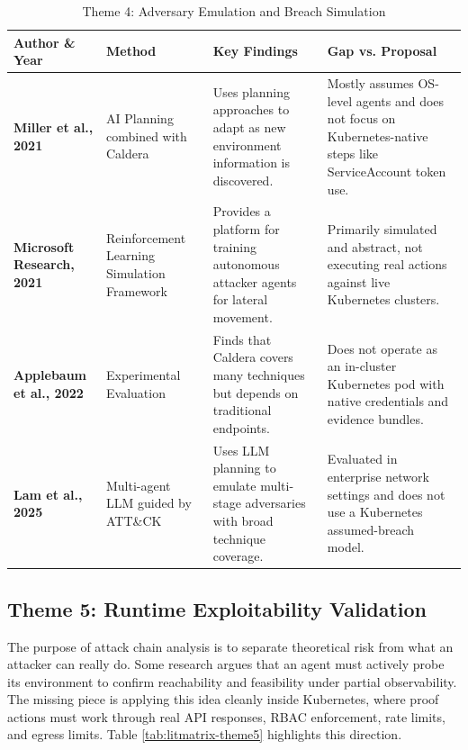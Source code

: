 \documentclass[conference]{IEEEtran}
\begin{document}
\begin{table}[t!]
\centering
\caption{Theme 4: Adversary Emulation and Breach Simulation}
\label{tab:litmatrix-theme4}
\scriptsize
\setlength{\tabcolsep}{5pt}
\renewcommand{\arraystretch}{1.3}
\begin{tabularx}{\textwidth}{l p{2.6cm} X X}
\toprule
\textbf{Author \& Year} & \textbf{Method} & \textbf{Key Findings} & \textbf{Gap vs. Proposal} \\
\midrule
\textbf{Miller et al., 2021} \cite{miller2021automated} & AI Planning combined with Caldera & Uses planning approaches to adapt as new environment information is discovered. & Mostly assumes OS-level agents and does not focus on Kubernetes-native steps like ServiceAccount token use. \\
\addlinespace
\textbf{Microsoft Research, 2021} \cite{microsoft2021cyberbattlesim} & Reinforcement Learning Simulation Framework & Provides a platform for training autonomous attacker agents for lateral movement. & Primarily simulated and abstract, not executing real actions against live Kubernetes clusters. \\
\addlinespace
\textbf{Applebaum et al., 2022} \cite{applebaum2022characterizing} & Experimental Evaluation & Finds that Caldera covers many techniques but depends on traditional endpoints. & Does not operate as an in-cluster Kubernetes pod with native credentials and evidence bundles. \\
\addlinespace
\textbf{Lam et al., 2025} \cite{lam2025autonomous} & Multi-agent LLM guided by ATT\&CK & Uses LLM planning to emulate multi-stage adversaries with broad technique coverage. & Evaluated in enterprise network settings and does not use a Kubernetes assumed-breach model. \\
\bottomrule
\end{tabularx}
\end{table}

\subsection{Theme 5: Runtime Exploitability Validation}
The purpose of attack chain analysis is to separate theoretical risk from what an attacker can really do. Some research argues that an agent must actively probe its environment to confirm reachability and feasibility under partial observability. The missing piece is applying this idea cleanly inside Kubernetes, where proof actions must work through real API responses, RBAC enforcement, rate limits, and egress limits. Table \ref{tab:litmatrix-theme5} highlights this direction.
\end{document}
